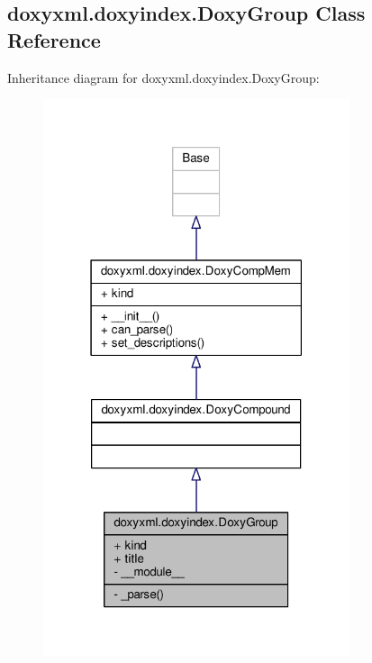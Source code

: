 \subsection{doxyxml.\+doxyindex.\+Doxy\+Group Class Reference}
\label{classdoxyxml_1_1doxyindex_1_1DoxyGroup}


Inheritance diagram for doxyxml.\+doxyindex.\+Doxy\+Group\+:
\nopagebreak
\begin{figure}[H]
\begin{center}
\leavevmode
\includegraphics[width=255pt]{d0/d33/classdoxyxml_1_1doxyindex_1_1DoxyGroup__inherit__graph}
\end{center}
\end{figure}


